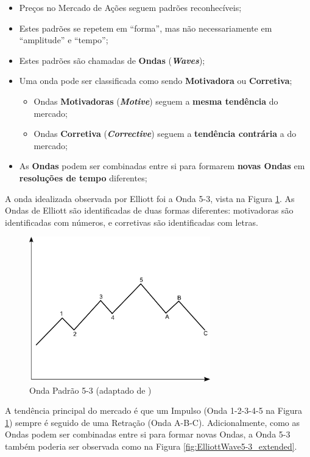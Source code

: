 \documentclass[12pt]{article}
\begin{document}
\begin{itemize}
	\item Preços no Mercado de Ações seguem padrões reconhecíveis;
	\item Estes padrões se repetem em ``forma'', mas não necessariamente em
		  ``amplitude'' e ``tempo'';
	\item Estes padrões são chamadas de \textbf{Ondas} (\textbf{\emph{Waves}});
	\item Uma onda pode ser classificada como sendo \textbf{Motivadora} ou \textbf{Corretiva};
	\begin{itemize}
		\item Ondas \textbf{Motivadoras} (\textbf{\emph{Motive}}) seguem a
			  \textbf{mesma tendência} do mercado;
		\item Ondas \textbf{Corretiva} (\textbf{\emph{Corrective}}) seguem a
			  \textbf{tendência contrária} a do mercado;
	\end{itemize}
	\item As \textbf{Ondas} podem ser combinadas entre si para formarem \textbf{novas Ondas}
		  em \textbf{resoluções de tempo} diferentes;
\end{itemize}

A onda idealizada observada por Elliott foi a Onda 5-3, vista na Figura \ref{fig:ElliottWave5-3}.
As Ondas de Elliott são identificadas de duas formas diferentes: motivadoras são identificadas
com números, e corretivas são identificadas com letras.

\begin{figure}[H]
	\centering
	\includegraphics[width=0.7\textwidth]{ElliottWave5-3.png}
	\caption{Onda Padrão 5-3 (adaptado de \cite{Masur})}\label{fig:ElliottWave5-3}
\end{figure}

A tendência principal do mercado é que um Impulso (Onda 1-2-3-4-5 na
Figura \ref{fig:ElliottWave5-3}) sempre é seguido de uma Retração (Onda A-B-C).
Adicionalmente, como as Ondas podem ser combinadas entre si para formar novas Ondas, a
Onda 5-3 também poderia ser observada como na Figura \ref{fig:ElliottWave5-3_extended}.
\end{document}

